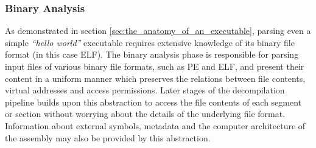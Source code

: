 
\subsubsection{Binary Analysis}
\label{sec:binary_analysis}

As demonstrated in section \ref{sec:the_anatomy_of_an_executable}, parsing even a simple \textit{``hello world''} executable requires extensive knowledge of its binary file format (in this case ELF). The binary analysis phase is responsible for parsing input files of various binary file formats, such as PE and ELF, and present their content in a uniform manner which preserves the relations between file contents, virtual addresses and access permissions. Later stages of the decompilation pipeline builds upon this abstraction to access the file contents of each segment or section without worrying about the details of the underlying file format. Information about external symbols, metadata and the computer architecture of the assembly may also be provided by this abstraction.
